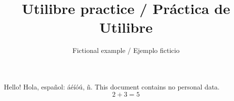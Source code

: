 \documentclass{article}
\title{Utilibre practice / Práctica de Utilibre}
\author{Fictional example / Ejemplo ficticio}
\date{}
\begin{document}
\maketitle
Hello! Hola, español: áéíóú, ñ. This document contains no personal data.
\[ 2 + 3 = 5 \]
\end{document}
